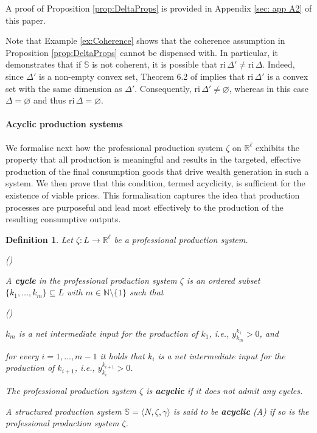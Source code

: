 \documentclass[11pt,fleqn]{article}
\newcounter{llst}
\newenvironment{abet}{\begin{list}{\rm (\alph{llst})}{\usecounter{llst}
		\setlength{\itemindent}{0em} \setlength{\leftmargin}{3em}
		\setlength{\labelwidth}{2em} \setlength{\labelsep}{1em}}}{\end{list}}
\newcounter{llist}
\newenvironment{numm}{\begin{list}{\rm (\roman{llist})}{\usecounter{llist}
	\setlength{\itemindent}{0em} \setlength{\leftmargin}{3.5em}
	\setlength{\labelwidth}{2.5em} \setlength{\labelsep}{1em}}}{\end{list}}
\newtheorem{definition}[theorem]{Definition}
\begin{document}
\noindent
A proof of Proposition \ref{prop:DeltaProps} is provided in Appendix \ref{sec: app A2} of this paper.

\medskip
\noindent Note that Example \ref{ex:Coherence} shows that the coherence assumption in Proposition \ref{prop:DeltaProps} cannot be dispensed with. In particular, it demonstrates that if $\mathbb S$ is not coherent, it is possible that $\mathrm{ri} \, \Delta' \neq \mathrm{ri} \, \Delta$. Indeed, since $\Delta'$ is a non-empty convex set, Theorem 6.2 of \citet{Rockafellar1970} implies that $\mathrm{ri} \, \Delta'$ is a convex set with the same dimension as $\Delta'$. Consequently, $\mathrm{ri} \, \Delta' \neq \varnothing$, whereas in this case $\Delta = \varnothing$ and thus $\mathrm{ri} \, \Delta = \varnothing$.

\paragraph{Acyclic production systems}

We formalise next how the professional production system $\zeta$ on $\mathbb R^\ell$ exhibits the property that all production is meaningful and results in the targeted, effective production of the final consumption goods that drive wealth generation in such a system. We then prove that this condition, termed acyclicity, is sufficient for the existence of viable prices. This formalisation captures the idea that production processes are purposeful and lead most effectively to the production of the resulting consumptive outputs. 

\begin{definition} \label{def:Acyclic}
	Let $\zeta \colon L \to \mathbb R^\ell$ be a professional production system.
	\begin{abet}
		\item A \textbf{cycle} in the professional production system $\zeta$ is an ordered subset $\{ k_1, \ldots , k_m \} \subseteq L$ with $m \in \mathbb N \setminus \{ 1 \}$ such that
		\begin{numm}
			\item $k_m$ is a net intermediate  input for the production of $k_1$, i.e., $y^{k_1}_{k_m} >0$, and
			\item for every $i =1, \ldots ,m-1$ it holds that $k_{i}$ is a net intermediate  input for the production of $k_{i+1}$, i.e., $y_{k_i}^{k_{i+1}} >0$.
		\end{numm} 
		\item The professional production system $\zeta$ is \textbf{acyclic} if it does not admit any cycles.
	\end{abet}
	A structured production system $\mathbb S = \langle N, \zeta , \gamma \rangle$ is said to be \textbf{acyclic} (A) if so is the professional production system $\zeta$.
\end{definition}
\end{document}
